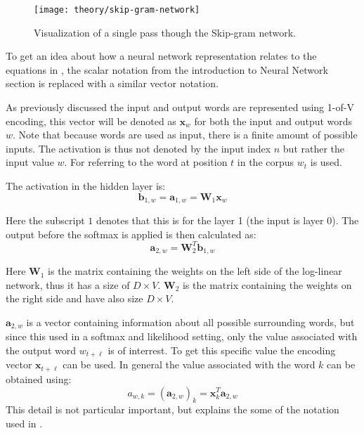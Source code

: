 \begin{figure}[H]
	\centering
	\texttt{[image: theory/skip-gram-network]}
	\caption{Visualization of a single pass though the Skip-gram network.}
\end{figure}

To get an idea about how a neural network representation relates to the equations in \cite{word2vec-details}, the scalar notation from the introduction to Neural Network section is replaced with a similar vector notation.

As previously discussed the input and output words are represented using 1-of-V encoding, this vector will be denoted as $\mathbf{x}_w$ for both the input and output words $w$. Note that because words are used as input, there is a finite amount of possible inputs. The activation is thus not denoted by the input index $n$ but rather the input value $w$. For referring to the word at position $t$ in the corpus $w_t$ is used.

The activation in the hidden layer is:
\begin{equation}
\mathbf{b}_{1,w} = \mathbf{a}_{1,w} = \mathbf{W}_{1} \mathbf{x}_w
\end{equation}

Here the subscript $1$ denotes that this is for the layer 1 (the input is layer 0). The output before the softmax is applied is then calculated as:
\begin{equation}
\mathbf{a}_{2,w} = \mathbf{W}_2^T \mathbf{b}_{1,w}
\end{equation}

Here $\mathbf{W}_1$ is the matrix containing the weights on the left side of the log-linear network, thus it has a size of $D \times V$. $\mathbf{W}_2$ is the matrix containing the weights on the right side and have also size $D \times V$.

$\mathbf{a}_{2,w}$ is a vector containing information about all possible surrounding words, but since this used in a softmax and likelihood setting, only the value associated with the output word $w_{t + \ell}$ is of interrest. To get this specific value the encoding vector $\mathbf{x}_{t + \ell}$ can be used. In general the value associated with the word $k$ can be obtained using:
\begin{equation}
a_{w,k} = \left(\mathbf{a}_{2,w}\right)_k = \mathbf{x}_{k}^T \mathbf{a}_{2,w}
\end{equation}
This detail is not particular important, but explains the some of the notation used in \cite{word2vec-details}.

